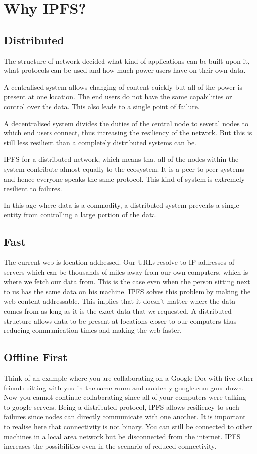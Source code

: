 \chapter{Why IPFS?}

\section{Distributed}
The structure of network decided what kind of applications can be built upon it, what protocols can be used and how much power users have on their own data.

A centralised system allows changing of content quickly but all of the power is present at one location. The end users do not have the same capabilities or control over the data. This also leads to a single point of failure.

A decentralised system divides the duties of the central node to several nodes to which end users connect, thus increasing the resiliency of the network. But this is still less resilient than a completely distributed systems can be.

IPFS for a distributed network, which means that all of the nodes within the system contribute almost equally to the ecosystem. It is a peer-to-peer systems and hence everyone speaks the same protocol. This kind of system is extremely resilient to failures.

In this age where data is a commodity, a distributed system prevents a single entity from controlling a large portion of the data.

\section{Fast}

The current web is location addressed. Our URLs resolve to IP addresses of servers which can be thousands of miles away from our own computers, which is where we fetch our data from. This is the case even when the person sitting next to us has the same data on his machine. IPFS solves this problem by making the web content addressable. This implies that it doesn't matter where the data comes from as long as it is the exact data that we requested. A distributed structure allows data to be present at locations closer to our computers thus reducing communication times and making the web faster.

\section{Offline First}

Think of an example where you are collaborating on a Google Doc with five other friends sitting with you in the same room and suddenly google.com goes down. Now you cannot continue collaborating since all of your computers were talking to google servers. Being a distributed protocol, IPFS allows resiliency to such failures since nodes can directly communicate with one another. It is important to realise here that connectivity is not binary. You can still be connected to other machines in a local area network but be disconnected from the internet. IPFS increases the possibilities even in the scenario of reduced connectivity.